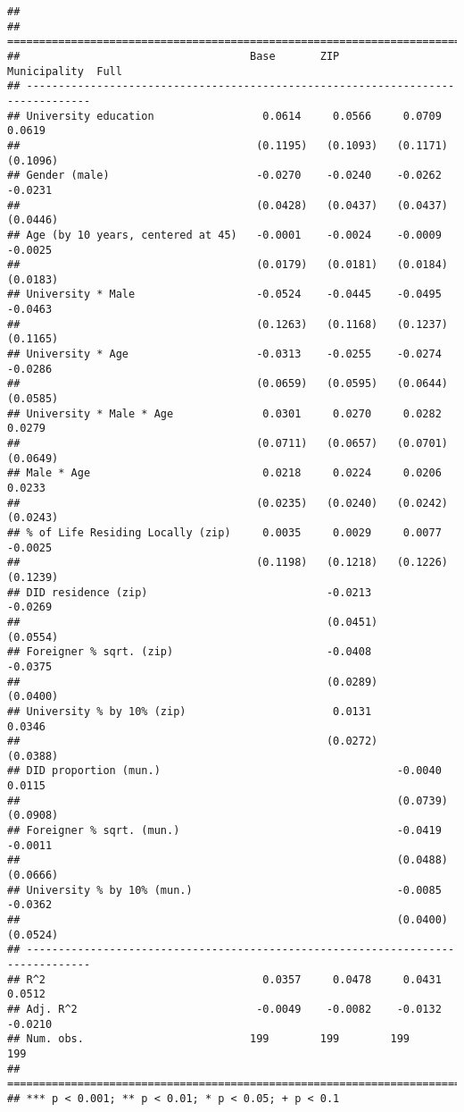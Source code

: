 \documentclass[
]{article}
\begin{document}
\begin{verbatim}
## 
## ================================================================================
##                                    Base       ZIP        Municipality  Full     
## --------------------------------------------------------------------------------
## University education                 0.0614     0.0566     0.0709        0.0619 
##                                     (0.1195)   (0.1093)   (0.1171)      (0.1096)
## Gender (male)                       -0.0270    -0.0240    -0.0262       -0.0231 
##                                     (0.0428)   (0.0437)   (0.0437)      (0.0446)
## Age (by 10 years, centered at 45)   -0.0001    -0.0024    -0.0009       -0.0025 
##                                     (0.0179)   (0.0181)   (0.0184)      (0.0183)
## University * Male                   -0.0524    -0.0445    -0.0495       -0.0463 
##                                     (0.1263)   (0.1168)   (0.1237)      (0.1165)
## University * Age                    -0.0313    -0.0255    -0.0274       -0.0286 
##                                     (0.0659)   (0.0595)   (0.0644)      (0.0585)
## University * Male * Age              0.0301     0.0270     0.0282        0.0279 
##                                     (0.0711)   (0.0657)   (0.0701)      (0.0649)
## Male * Age                           0.0218     0.0224     0.0206        0.0233 
##                                     (0.0235)   (0.0240)   (0.0242)      (0.0243)
## % of Life Residing Locally (zip)     0.0035     0.0029     0.0077       -0.0025 
##                                     (0.1198)   (0.1218)   (0.1226)      (0.1239)
## DID residence (zip)                            -0.0213                  -0.0269 
##                                                (0.0451)                 (0.0554)
## Foreigner % sqrt. (zip)                        -0.0408                  -0.0375 
##                                                (0.0289)                 (0.0400)
## University % by 10% (zip)                       0.0131                   0.0346 
##                                                (0.0272)                 (0.0388)
## DID proportion (mun.)                                     -0.0040        0.0115 
##                                                           (0.0739)      (0.0908)
## Foreigner % sqrt. (mun.)                                  -0.0419       -0.0011 
##                                                           (0.0488)      (0.0666)
## University % by 10% (mun.)                                -0.0085       -0.0362 
##                                                           (0.0400)      (0.0524)
## --------------------------------------------------------------------------------
## R^2                                  0.0357     0.0478     0.0431        0.0512 
## Adj. R^2                            -0.0049    -0.0082    -0.0132       -0.0210 
## Num. obs.                          199        199        199           199      
## ================================================================================
## *** p < 0.001; ** p < 0.01; * p < 0.05; + p < 0.1
\end{verbatim}
\end{document}
